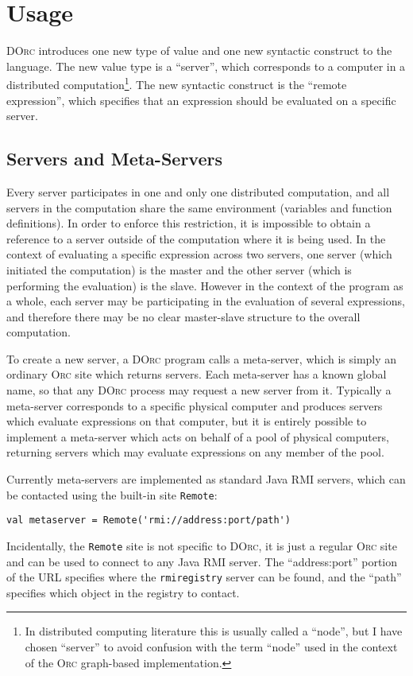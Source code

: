 \documentclass[10pt,letterpaper]{article}
\begin{document}
\section{Usage}

\textsc{DOrc} introduces one new type of value and one new syntactic construct
to the language. The new value type is a ``server'', which corresponds to a
computer in a distributed computation\footnote{In distributed computing
literature this is usually called a ``node'', but I have chosen ``server'' to
avoid confusion with the term ``node'' used in the context of the \textsc{Orc}
graph-based implementation.}. The new syntactic construct is the ``remote
expression'', which specifies that an expression should be evaluated on a
specific server.

\subsection{Servers and Meta-Servers}

Every server participates in one and only one distributed computation, and all
servers in the computation share the same environment (variables and function
definitions). In order to enforce this restriction, it is impossible to obtain
a reference to a server outside of the computation where it is being used. In
the context of evaluating a specific expression across two servers, one server
(which initiated the computation) is the master and the other server (which is
performing the evaluation) is the slave. However in the context of the program
as a whole, each server may be participating in the evaluation of several
expressions, and therefore there may be no clear master-slave structure to the
overall computation.

To create a new server, a \textsc{DOrc} program calls a meta-server, which is
simply an ordinary \textsc{Orc} site which returns servers. Each meta-server
has a known global name, so that any \textsc{DOrc} process may request a new
server from it. Typically a meta-server corresponds to a specific physical
computer and produces servers which evaluate expressions on that computer, but
it is entirely possible to implement a meta-server which acts on behalf of a
pool of physical computers, returning servers which may evaluate expressions on
any member of the pool.

Currently meta-servers are implemented as standard Java RMI servers, which can
be contacted using the built-in site \texttt{Remote}:
\begin{verbatim}
val metaserver = Remote('rmi://address:port/path')
\end{verbatim}
Incidentally, the \texttt{Remote} site is not specific to \textsc{DOrc}, it is
just a regular \textsc{Orc} site and can be used to connect to any Java RMI
server. The ``address:port'' portion of the URL specifies where the
\texttt{rmiregistry} server can be found, and the ``path'' specifies which
object in the registry to contact.
\end{document}
